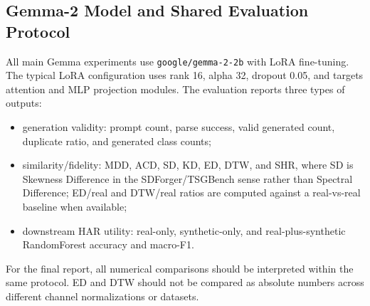 \begin{table}[t]
\centering
\small
\caption{Dataset processing choices for the Gemma-2 experiment line.}
\label{tab:shanjun-datasets}
\end{table}

\subsection*{Gemma-2 Model and Shared Evaluation Protocol}

All main Gemma experiments use \texttt{google/gemma-2-2b} with LoRA fine-tuning.
The typical LoRA configuration uses rank 16, alpha 32, dropout 0.05, and targets
attention and MLP projection modules. The evaluation reports three types of
outputs:
\begin{itemize}
  \item generation validity: prompt count, parse success, valid generated count,
  duplicate ratio, and generated class counts;
  \item similarity/fidelity: MDD, ACD, SD, KD, ED, DTW, and SHR, where SD is
  Skewness Difference in the SDForger/TSGBench sense rather than Spectral
  Difference; ED/real and DTW/real ratios are computed against a real-vs-real
  baseline when available;
  \item downstream HAR utility: real-only, synthetic-only, and real-plus-synthetic
  RandomForest accuracy and macro-F1.
\end{itemize}
For the final report, all numerical comparisons should be interpreted within the
same protocol. ED and DTW should not be compared as absolute numbers across
different channel normalizations or datasets.

